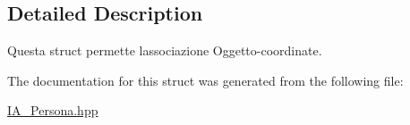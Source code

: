 \subsection{Detailed Description}
Questa struct permette l\textquotesingle{}associazione Oggetto-\/coordinate. 

The documentation for this struct was generated from the following file\+:\begin{DoxyCompactItemize}
\item 
\hyperlink{IA__Persona_8hpp}{I\+A\+\_\+\+Persona.\+hpp}\end{DoxyCompactItemize}
